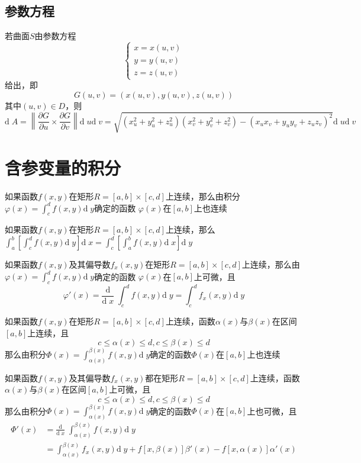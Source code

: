 \documentclass[UTF8]{ctexart}
\newcommand{\cross}{\times}
\newcommand{\dif}[1]{{\text{d}\;\!#1}}
\newcommand{\dev}[1]{{\frac{\text{d}}{\dif{#1}}\;\!}}
\newcommand{\norm}[1]{{\left\|#1\right\|}}
\begin{document}
\subsection*{参数方程}
若曲面$S$由参数方程
\[\begin{cases}
x=x(u,v)\\
y=y(u,v)\\
z=z(u,v)
\end{cases}\]
给出，即
\[G(u,v)=(x(u,v),y(u,v),z(u,v))\]
其中$(u,v)\in D$，则
\[\dif{A}=\norm{\frac{\partial G}{\partial u}\cross\frac{\partial G}{\partial v}}\dif{u}\dif{v}=\sqrt{(x_u^2+y_u^2+z_u^2)(x_v^2+y_v^2+z_v^2)-(x_ux_v+y_uy_v+z_uz_v)^2}\dif{u}\dif{v}\]
\bigskip
\bigskip

\section*{含参变量的积分}
如果函数$f(x,y)$在矩形$R=[a,b]\cross[c,d]$上连续，那么由积分$\varphi(x)=\int_c^df(x,y)\dif{y}$确定的函数
$\varphi(x)$在$[a,b]$上也连续

\bigskip

如果函数$f(x,y)$在矩形$R=[a,b]\cross[c,d]$上连续，那么$\int_a^b[\int_c^df(x,y)\dif{y}]\dif{x}=\int_c^d[\int_a^bf(x,y)\dif{x}]\dif{y}$

\bigskip

如果函数$f(x,y)$及其偏导数$f_x(x,y)$在矩形$R=[a,b]\cross[c,d]$上连续，那么由$\varphi(x)=\int_c^df(x,y)\dif{y}$确定的函数
$\varphi(x)$在$[a,b]$上可微，且
\[ \varphi'(x)=\dev{x}\int_c^df(x,y)\dif{y}=\int_c^df_x(x,y)\dif{y} \]

\bigskip

如果函数$f(x,y)$在矩形$R=[a,b]\cross[c,d]$上连续，函数$\alpha(x)$与$\beta(x)$在区间$[a,b]$上连续，且
\[ c\le\alpha(x)\le d,c\le\beta(x)\le d \]
那么由积分$\displaystyle\Phi(x)=\int^{\beta(x)}_{\alpha(x)}f(x,y)\dif{y}$确定的函数$\Phi(x)$在$[a,b]$上也连续

\bigskip

如果函数$f(x,y)$及其偏导数$f_x(x,y)$都在矩形$R=[a,b]\cross[c,d]$上连续，函数$\alpha(x)$与$\beta(x)$在区间$[a,b]$上可微，且
\[ c\le\alpha(x)\le d,c\le\beta(x)\le d \]
那么由积分$\Phi(x)=\int^{\beta(x)}_{\alpha(x)}f(x,y)\dif{y}$确定的函数$\Phi(x)$在$[a,b]$上也可微，且
\[
\begin{aligned}
\Phi'(x)&=\dev{x}\int^{\beta(x)}_{\alpha(x)}f(x,y)\dif{y}\\
&=\int^{\beta(x)}_{\alpha(x)}f_x(x,y)\dif{y}+f[x,\beta(x)]\beta'(x)-f[x,\alpha(x)]\alpha'(x)
\end{aligned}
\]
\end{document}
